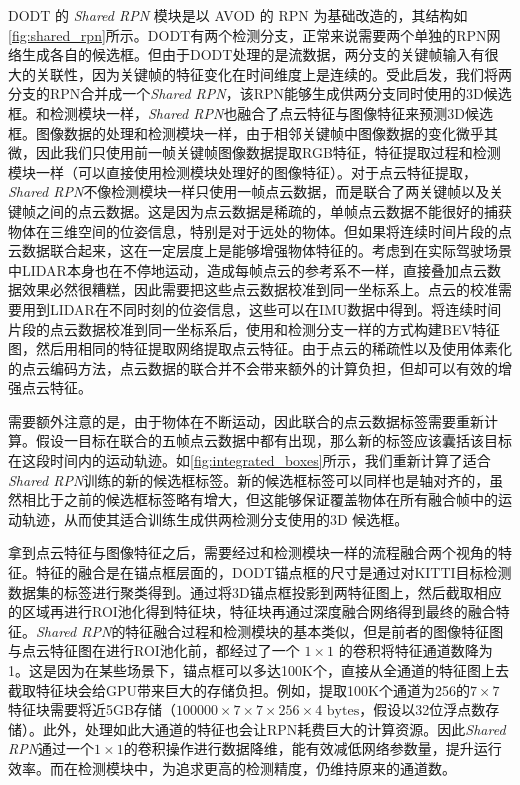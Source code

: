 DODT 的 \textit{Shared RPN} 模块是以 AVOD 的 RPN 为基础改造的，其结构如\figurename \ref{fig:shared_rpn}所示。DODT有两个检测分支，正常来说需要两个单独的RPN网络生成各自的候选框。但由于DODT处理的是流数据，两分支的关键帧输入有很大的关联性，因为关键帧的特征变化在时间维度上是连续的。受此启发，我们将两分支的RPN合并成一个\textit{Shared RPN}，该RPN能够生成供两分支同时使用的3D候选框。和检测模块一样，\textit{Shared RPN}也融合了点云特征与图像特征来预测3D候选框。图像数据的处理和检测模块一样，由于相邻关键帧中图像数据的变化微乎其微，因此我们只使用前一帧关键帧图像数据提取RGB特征，特征提取过程和检测模块一样（可以直接使用检测模块处理好的图像特征）。对于点云特征提取，\textit{Shared RPN}不像检测模块一样只使用一帧点云数据，而是联合了两关键帧以及关键帧之间的点云数据。这是因为点云数据是稀疏的，单帧点云数据不能很好的捕获物体在三维空间的位姿信息，特别是对于远处的物体。但如果将连续时间片段的点云数据联合起来，这在一定层度上是能够增强物体特征的。考虑到在实际驾驶场景中LIDAR本身也在不停地运动，造成每帧点云的参考系不一样，直接叠加点云数据效果必然很糟糕，因此需要把这些点云数据校准到同一坐标系上。点云的校准需要用到LIDAR在不同时刻的位姿信息，这些可以在IMU数据中得到。将连续时间片段的点云数据校准到同一坐标系后，使用和检测分支一样的方式构建BEV特征图，然后用相同的特征提取网络提取点云特征。由于点云的稀疏性以及使用体素化的点云编码方法，点云数据的联合并不会带来额外的计算负担，但却可以有效的增强点云特征。



需要额外注意的是，由于物体在不断运动，因此联合的点云数据标签需要重新计算。假设一目标在联合的五帧点云数据中都有出现，那么新的标签应该囊括该目标在这段时间内的运动轨迹。如\figurename \ref{fig:integrated_boxes}所示，我们重新计算了适合\textit{Shared RPN}训练的新的候选框标签。新的候选框标签可以同样也是轴对齐的，虽然相比于之前的候选框标签略有增大，但这能够保证覆盖物体在所有融合帧中的运动轨迹，从而使其适合训练生成供两检测分支使用的3D 候选框。

拿到点云特征与图像特征之后，需要经过和检测模块一样的流程融合两个视角的特征。特征的融合是在锚点框层面的，DODT锚点框的尺寸是通过对KITTI目标检测数据集的标签进行聚类得到。通过将3D锚点框投影到两特征图上，然后截取相应的区域再进行ROI池化得到特征块，特征块再通过深度融合网络得到最终的融合特征。\textit{Shared RPN}的特征融合过程和检测模块的基本类似，但是前者的图像特征图与点云特征图在进行ROI池化前，都经过了一个 $1 \times 1$ 的卷积将特征通道数降为1。这是因为在某些场景下，锚点框可以多达100K个，直接从全通道的特征图上去截取特征块会给GPU带来巨大的存储负担。例如，提取100K个通道为256的$7 \times 7$特征块需要将近5GB存储（$100000 \times 7 \times 7 \times 256 \times 4 \text{ bytes}$，假设以32位浮点数存储）。此外，处理如此大通道的特征也会让RPN耗费巨大的计算资源。因此\textit{Shared RPN}通过一个$1 \times 1$的卷积操作进行数据降维，能有效减低网络参数量，提升运行效率。而在检测模块中，为追求更高的检测精度，仍维持原来的通道数。

